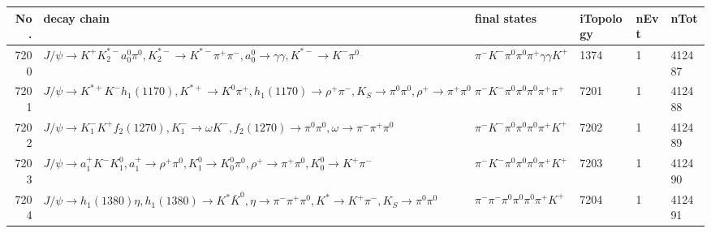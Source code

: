 \begin{table}[htbp] 
\begin{center}
\begin{small}
\begin{tabular}{rlllll}\hline\hline
 No. & decay chain & final states &  iTopology & nEvt & nTot \\\hline
7200&$J/\psi       \rightarrow K^{+}          K_2^{*-}       a_{0}^{0}      \pi^{0}        , K_2^{*-}        \rightarrow K^{*-}         \pi^{+}        \pi^{-}        , a_{0}^{0}       \rightarrow \gamma       \gamma       , K^{*-}          \rightarrow K^{-}          \pi^{0}        $&$\pi^{-}        K^{-}          \pi^{0}        \pi^{0}        \pi^{+}        \gamma       \gamma       K^{+}          $& 1374&    1&412487\\
7201&$J/\psi       \rightarrow K^{*+}         K^{-}          h_{1}(1170)    , K^{*+}          \rightarrow K^{0}          \pi^{+}        , h_{1}(1170)     \rightarrow \rho^{+}      \pi^{-}        , K_{S}           \rightarrow \pi^{0}        \pi^{0}        , \rho^{+}       \rightarrow \pi^{+}        \pi^{0}        $&$\pi^{-}        K^{-}          \pi^{0}        \pi^{0}        \pi^{0}        \pi^{+}        \pi^{+}        $& 7201&    1&412488\\
7202&$J/\psi       \rightarrow K_{1}^{-}      K^{+}          f_{2}(1270)    , K_{1}^{-}       \rightarrow \omega         K^{-}          , f_{2}(1270)     \rightarrow \pi^{0}        \pi^{0}        , \omega          \rightarrow \pi^{-}        \pi^{+}        \pi^{0}        $&$\pi^{-}        K^{-}          \pi^{0}        \pi^{0}        \pi^{0}        \pi^{+}        K^{+}          $& 7202&    1&412489\\
7203&$J/\psi       \rightarrow a_{1}^{+}      K^{-}          K_1^{0}        , a_{1}^{+}       \rightarrow \rho^{+}      \pi^{0}        , K_1^{0}         \rightarrow K_0^{0}        \pi^{0}        , \rho^{+}       \rightarrow \pi^{+}        \pi^{0}        , K_0^{0}         \rightarrow K^{+}          \pi^{-}        $&$\pi^{-}        K^{-}          \pi^{0}        \pi^{0}        \pi^{0}        \pi^{+}        K^{+}          $& 7203&    1&412490\\
7204&$J/\psi       \rightarrow h_{1}(1380)    \eta          , h_{1}(1380)     \rightarrow K^{*}          \bar{K}^{0}   , \eta           \rightarrow \pi^{-}        \pi^{+}        \pi^{0}        , K^{*}           \rightarrow K^{+}          \pi^{-}        , K_{S}           \rightarrow \pi^{0}        \pi^{0}        $&$\pi^{-}        \pi^{-}        \pi^{0}        \pi^{0}        \pi^{0}        \pi^{+}        K^{+}          $& 7204&    1&412491\\

\end{tabular}
\end{small}
\end{center}
\end{table}
